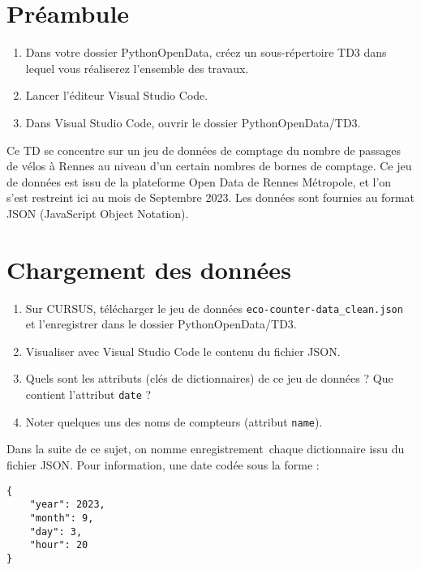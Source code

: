 \documentclass[11pt,a4paper]{article}
\begin{document}

\section*{Préambule}
\begin{enumerate}
    \item Dans votre dossier PythonOpenData, créez un sous-répertoire TD3 dans lequel vous réaliserez l'ensemble des travaux.
    \item Lancer l'éditeur Visual Studio Code.
    \item Dans Visual Studio Code, ouvrir le dossier PythonOpenData/TD3. 
\end{enumerate}

Ce TD se concentre sur un jeu de données de comptage du nombre de passages de vélos à Rennes au niveau d'un certain nombres de bornes de comptage. 
Ce jeu de données est issu de la plateforme Open Data de Rennes Métropole, et l'on s'est restreint ici au mois de Septembre 2023. Les données sont fournies au format JSON (JavaScript Object Notation).

\section{Chargement des données}

\begin{enumerate}
    \item Sur CURSUS, télécharger le jeu de données \verb+eco-counter-data_clean.json+ et l'enregistrer dans le dossier PythonOpenData/TD3.
    \item Visualiser avec Visual Studio Code le contenu du fichier JSON.
    \item Quels sont les attributs (clés de dictionnaires) de ce jeu de données ? Que contient l'attribut \verb+date+ ?
    \item Noter quelques uns des noms de compteurs (attribut \verb+name+).
\end{enumerate}

Dans la suite de ce sujet, on nomme \og enregistrement\fg ~chaque dictionnaire issu du fichier JSON.
Pour information, une date codée sous la forme :
\begin{verbatim}
{
    "year": 2023,
    "month": 9,
    "day": 3,
    "hour": 20
}
\end{verbatim}
\end{document}

